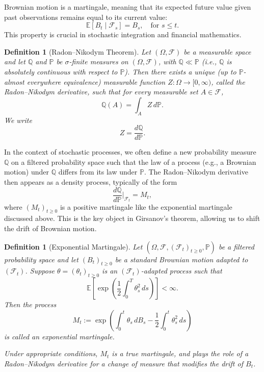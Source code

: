 \documentclass[11pt, twoside]{report}
\newtheorem{definition}[theorem]{Definition}
\begin{document}
Brownian motion is a martingale, meaning that its expected future value given past observations remains equal to its current value:
\begin{equation}
    \mathbb{E}[B_t \mid \mathcal{F}_s] = B_s, \quad \text{for } s \leq t.
\end{equation}
This property is crucial in stochastic integration and financial mathematics.

\begin{definition}[Radon--Nikodym Theorem]
Let $(\Omega, \mathcal{F})$ be a measurable space and let $\mathbb{Q}$ and $\mathbb{P}$ be $\sigma$-finite measures on $(\Omega, \mathcal{F})$, with $\mathbb{Q} \ll \mathbb{P}$ (i.e., $\mathbb{Q}$ is absolutely continuous with respect to $\mathbb{P}$). Then there exists a unique (up to $\mathbb{P}$-almost everywhere equivalence) measurable function $Z : \Omega \to [0,\infty)$, called the Radon--Nikodym derivative, such that for every measurable set $A \in \mathcal{F}$,
\[
\mathbb{Q}(A) = \int_A Z \, d\mathbb{P}.
\]
We write
\[
Z = \frac{d\mathbb{Q}}{d\mathbb{P}}.
\]
\end{definition}
In the context of stochastic processes, we often define a new probability measure $\mathbb{Q}$ on a filtered probability space such that the law of a process (e.g., a Brownian motion) under $\mathbb{Q}$ differs from its law under $\mathbb{P}$. The Radon--Nikodym derivative then appears as a density process, typically of the form
\[
\frac{d\mathbb{Q}}{d\mathbb{P}} \bigg|_{\mathcal{F}_t} = M_t,
\]
where $(M_t)_{t \geq 0}$ is a positive martingale like the exponential martingale discussed above. This is the key object in Girsanov’s theorem, allowing us to shift the drift of Brownian motion.

\begin{definition}[Exponential Martingale]
Let $(\Omega, \mathcal{F}, (\mathcal{F}_t)_{t \geq 0}, \mathbb{P})$ be a filtered probability space and let $(B_t)_{t \geq 0}$ be a standard Brownian motion adapted to $(\mathcal{F}_t)$. Suppose $\theta = (\theta_t)_{t \geq 0}$ is an $(\mathcal{F}_t)$-adapted process such that
\[
\mathbb{E} \left[ \exp\left( \frac{1}{2} \int_0^T \theta_s^2 \, ds \right) \right] < \infty.
\]
Then the process
\[
M_t := \exp\left( \int_0^t \theta_s \, dB_s - \frac{1}{2} \int_0^t \theta_s^2 \, ds \right)
\]
is called an \emph{exponential martingale}.

\medskip
Under appropriate conditions, $M_t$ is a true martingale, and plays the role of a Radon--Nikodym derivative for a change of measure that modifies the drift of $B_t$.
\end{definition}
\end{document}
